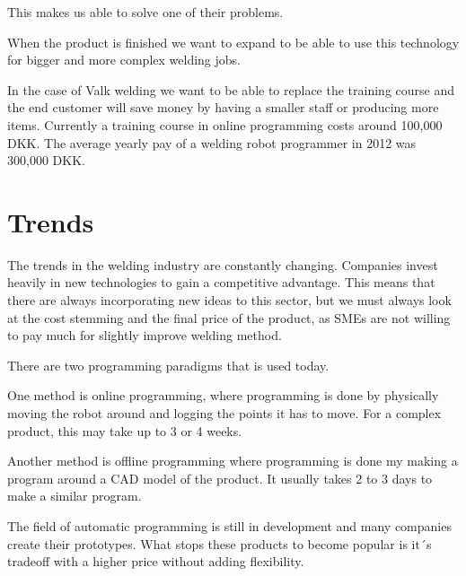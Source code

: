 This makes us able to solve one of their problems. 

When the product is finished we want to expand to be able to use this technology for bigger and more complex welding jobs.

In the case of Valk welding we want to be able to replace the training course and the end customer will save money by having a smaller staff or producing more items. 
Currently a training course in online programming costs around 100,000 DKK. 
The average yearly pay of a welding robot programmer in 2012 was 300,000 DKK. 

\section{Trends}
The trends in the welding industry are constantly changing. 
Companies invest heavily in new technologies to gain a competitive advantage. 
This means that there are always incorporating new ideas to this sector, but we must always look at the cost stemming and the final price of the product, as SMEs are not willing to pay much for slightly improve welding method.

There are two programming paradigms that is used today.

One method is online programming, where programming is done by physically moving the robot around and logging the points it has to move. For a complex product, this may take up to 3 or 4 weeks.

Another method is offline programming where programming is done my making a program around a CAD model of the product.
It usually takes 2 to 3 days to make a similar program.

The field of automatic programming is still in development and many companies create their prototypes. 
What stops these products to become popular is it´s tradeoff with a higher price without adding flexibility.